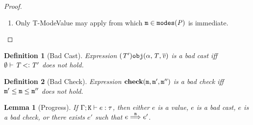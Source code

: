 \documentclass[onecolumn,nocopyrightspace]{sigplanconf}
\newtheorem{lemma}{Lemma}
\newtheorem{definition}{Definition}
\theoremstyle{lessintrusive}
\theoremstyle{plain}
\theoremstyle{custom}
\begin{document}
\begin{proof}
\begin{enumerate}[(\arabic*)]
\item Only T-ModeValue may apply from which $\mathtt{m} \in \mathtt{modes}(\mathit{P})$ is immediate.

\end{enumerate}



\end{proof}

\begin{definition}[Bad Cast]
Expression $(\mathit{T}') \mathtt{obj}(\alpha,\mathit{T},\overline{\mathit{v}})$ is a bad cast iff $\emptyset \vdash \mathit{T} \mathbin{<\vcentcolon} \mathit{T}'$ does not hold.
\label{pf:badcast}
\end{definition}

\begin{definition}[Bad Check]
Expression $\texttt{\bf check}(\mathtt{m},\mathtt{m}',\mathtt{m}'')$ is a bad check iff $\mathtt{m}' \leq \mathtt{m} \leq \mathtt{m}''$ does not hold.
\label{pf:badcheck}
\end{definition} 

\begin{lemma}[Progress]
\label{pf:progress}
If $\Gamma;\mathtt{K} \vdash e : \tau$, then either $e$ is a value, $e$ is a bad cast, $e$ is a bad check, or there exists $e'$ such that $e \stackrel{\mathtt{m}}{\Longrightarrow} e'$.
\end{lemma}
\end{document}
